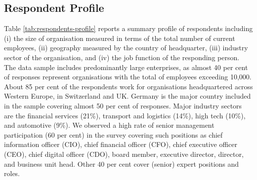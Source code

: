 \documentclass{article}
\begin{document}

\subsection{Respondent Profile}

Table \ref{tab:respondents-profile} reports a summary profile of respondents including (i) the size of organisation measured in terms of the total number of current employees, (ii) geography measured by the country of headquarter, (iii) industry sector of the organisation, and (iv) the job function of the responding person. The data sample includes predominantly large enterprises, as almost 40 per cent of responses represent organisations with the total of employees exceeding 10,000. About 85 per cent of the respondents work for organisations headquartered across Western Europe, in Switzerland and UK. Germany is the major country included in the sample covering almost 50 per cent of responses. Major industry sectors are the financial services (21\%), transport and logistics (14\%), high tech (10\%), and automotive (9\%). We observed a high rate of senior management participation (60 per cent) in the survey covering such positions as chief information officer (CIO), chief financial officer (CFO), chief executive officer (CEO), chief digital officer (CDO), board member, executive director, director, and business unit head. Other 40 per cent cover (senior) expert positions and roles.
\end{document}
